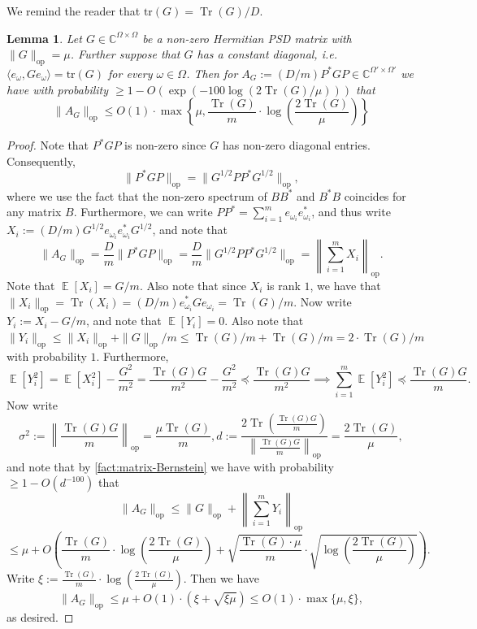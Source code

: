 \documentclass
[11pt,letterpaper]
{article}
\newtheorem{lemma}[theorem]{Lemma}
\theoremstyle{definition}
\newcommand{\Tr}{\operatorname{Tr}}
\newcommand{\1}{\mathbf{1}}
\newcommand{\tr}{\mathrm{tr}}
\newcommand{\C}{\mathbb C}
\DeclareMathOperator*{\E}{\mathbb{E}}
\renewcommand{\geq}{\geqslant}
\renewcommand{\leq}{\leqslant}
\renewcommand{\preceq}{\preccurlyeq}
\begin{document}
We remind the reader that $\tr(G) = \Tr(G)/D$.
\begin{lemma}\label{lem:random-proj-compression}
    Let $G\in\C^{\Omega\times\Omega}$ be a non-zero Hermitian PSD matrix with $\|G\|_{\operatorname{op}} = \mu$. Further suppose that $G$ has a constant diagonal, i.e. $\langle e_\omega, Ge_\omega\rangle = \tr(G)$ for every $\omega\in\Omega$. Then for $A_G:= (D/m)P^*GP\in\C^{\Omega'\times\Omega'}$ we have with probability $\geq 1 - O(\exp(-100\log(2\Tr(G)/\mu)))$ that
    \[\|A_G\|_{\operatorname{op}}\leq O(1)\cdot\max\left\{\mu, \frac{\Tr(G)}{m}\cdot\log\left(\frac{2\Tr(G)}{\mu}\right)\right\}\]
\end{lemma}
\begin{proof}
    Note that $P^*GP$ is non-zero since $G$ has non-zero diagonal entries. Consequently, 
    \[\|P^*GP\|_{\operatorname{op}} = \|G^{1/2}PP^*G^{1/2}\|_{\operatorname{op}},\]
    where we use the fact that the non-zero spectrum of $BB^*$ and $B^*B$ coincides for any matrix $B$. Furthermore, we can write $PP^* = \sum_{i = 1}^{m}e_{\omega_i} e_{\omega_i}^*$, and thus write $X_i:= (D/m) G^{1/2}e_{\omega_i} e_{\omega_i}^*G^{1/2}$, and note that
    \[\|A_G\|_{\operatorname{op}} = \frac{D}{m}\|P^*GP\|_{\operatorname{op}} = \frac{D}{m}\|G^{1/2}PP^*G^{1/2}\|_{\operatorname{op}} = \left\|\sum_{i = 1}^mX_i\right\|_{\operatorname{op}}.\]
    Note that $\E[X_i] = G/m$. Also note that since $X_i$ is rank $1$, we have that $\|X_i\|_{\operatorname{op}} = \Tr(X_i) = (D/m)e_{\omega_i}^*Ge_{\omega_i} = \Tr(G)/m$. Now write $Y_i:= X_i - G/m$, and note that $\E[Y_i] = 0$. Also note that $\|Y_i\|_{\operatorname{op}}\leq\|X_i\|_{\operatorname{op}} + \|G\|_{\operatorname{op}}/m\leq\Tr(G)/m + \Tr(G)/m = 2\cdot\Tr(G)/m$ with probability $1$. Furthermore, 
    \[\E[Y_i^2] = \E[X_i^2] - \frac{G^2}{m^2} = \frac{\Tr(G)G}{m^2} - \frac{G^2}{m^2}\preceq \frac{\Tr(G)G}{m^2}\implies\sum_{i = 1}^m\E[Y_i^2]\preceq\frac{\Tr(G)G}{m}.\] 
    Now write 
    \[\sigma^2:= \left\|\frac{\Tr(G)G}{m}\right\|_{\operatorname{op}} = \frac{\mu\Tr(G)}{m}, d:= \frac{2\Tr\left(\frac{\Tr(G)G}{m}\right)}{\left\|\frac{\Tr(G)G}{m}\right\|_{\operatorname{op}}} = \frac{2\Tr(G)}{\mu},\]
    and note that by \cref{fact:matrix-Bernstein} we have with probability $\geq 1 - O(d^{-100})$ that 
    \[\|A_G\|_{\operatorname{op}}\leq \|G\|_{\operatorname{op}} + \left\|\sum_{i = 1}^mY_i\right\|_{\operatorname{op}}\] 
    \[\leq \mu + O\left(\frac{\Tr(G)}{m}\cdot\log\left(\frac{2\Tr(G)}{\mu}\right) + \sqrt{\frac{\Tr(G)\cdot\mu}{m}}\cdot\sqrt{\log\left(\frac{2\Tr(G)}{\mu}\right)}\right).\]
    Write $\xi:= \frac{\Tr(G)}{m}\cdot\log\left(\frac{2\Tr(G)}{\mu}\right)$. Then we have 
     \[\|A_G\|_{\operatorname{op}}\leq \mu + O(1)\cdot(\xi + \sqrt{\xi\mu})\leq O(1)\cdot\max\{\mu, \xi\},\]
    as desired.
\end{proof} 
\end{document}
